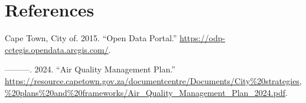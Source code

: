 \documentclass[
]{article}
\newlength{\cslhangindent}
\newenvironment{CSLReferences}[2] %
 {\begin{list}{}{%
  \setlength{\itemindent}{0pt}
  \setlength{\leftmargin}{0pt}
  \setlength{\parsep}{0pt}
  \ifodd #1
   \setlength{\leftmargin}{\cslhangindent}
   \setlength{\itemindent}{-1\cslhangindent}
  \fi
  \setlength{\itemsep}{#2\baselineskip}}}
 {\end{list}}
\begin{document}
\section*{References}\label{references}

\label{refs}
\begin{CSLReferences}{1}{0}
Cape Town, City of. 2015. {``Open Data Portal.''}
\url{https://odp-cctegis.opendata.arcgis.com/}.

---------. 2024. {``Air Quality Management Plan.''}
\url{https://resource.capetown.gov.za/documentcentre/Documents/City\%20strategies,\%20plans\%20and\%20frameworks/Air_Quality_Management_Plan_2024.pdf}.

\end{CSLReferences}
\end{document}

